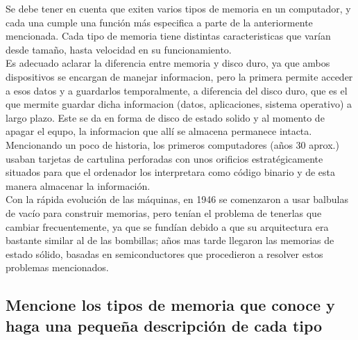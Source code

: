 \documentclass{article}
\begin{document}
\noindent
Se debe tener en cuenta que exiten varios tipos de memoria en un computador, y cada una cumple una función más especifica a parte de la anteriormente mencionada. Cada tipo de memoria tiene distintas caracteristicas que varían desde tamaño, hasta velocidad en su funcionamiento.\\
\noindent
Es adecuado aclarar la diferencia entre memoria y disco duro, ya que ambos dispositivos se encargan de manejar informacion, pero la primera permite acceder a esos datos y a guardarlos temporalmente, a diferencia del disco duro, que es el que mermite guardar dicha informacion (datos, aplicaciones, sistema operativo) a largo plazo. Este se da en forma de disco de estado solido y al momento de apagar el equpo, la informacion que allí se almacena permanece intacta.\\

\noindent
Mencionando un poco de historia, los primeros computadores (años 30 aprox.) usaban tarjetas de cartulina perforadas con unos orificios estratégicamente situados para que el ordenador los interpretara como código binario y de esta manera almacenar la información.\\
\noindent
Con la rápida evolución de las máquinas, en 1946 se comenzaron a usar balbulas de vacío para construir memorias, pero tenían el problema de tenerlas que cambiar frecuentemente, ya que se fundían debido a que su arquitectura era bastante similar al de las bombillas; años mas tarde llegaron las memorias de estado sólido, basadas en semiconductores que procedieron a resolver estos problemas mencionados. 

\subsection{Mencione los tipos de memoria que conoce y haga una pequeña descripción de cada tipo}
%
\end{document}
